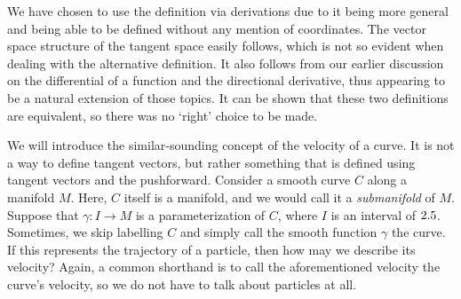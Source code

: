 \documentclass[a4paper,12pt]{article}
\begin{document}
We have chosen to use the definition via derivations due to it being more general and being able to be defined without any mention of coordinates.
The vector space structure of the tangent space easily follows, which is not so evident when dealing with the alternative definition.
It also follows from our earlier discussion on the differential of a function and the directional derivative, thus appearing to be a natural extension of those topics.
It can be shown that these two definitions are equivalent, so there was no `right' choice to be made.

We will introduce the similar-sounding concept of the velocity of a curve.
It is not a way to define tangent vectors, but rather something that is defined using tangent vectors and the pushforward.
Consider a smooth curve $C$ along a manifold $M$.
Here, $C$ itself is a manifold, and we would call it a \emph{submanifold} of $M$.
Suppose that $\gamma \colon I \to M$ is a parameterization of $C$, where $I$ is an interval of $2.5$.
Sometimes, we skip labelling $C$ and simply call the smooth function $\gamma$ the curve.
If this represents the trajectory of a particle, then how may we describe its velocity?
Again, a common shorthand is to call the aforementioned velocity the curve's velocity, so we do not have to talk about particles at all.
\end{document}
